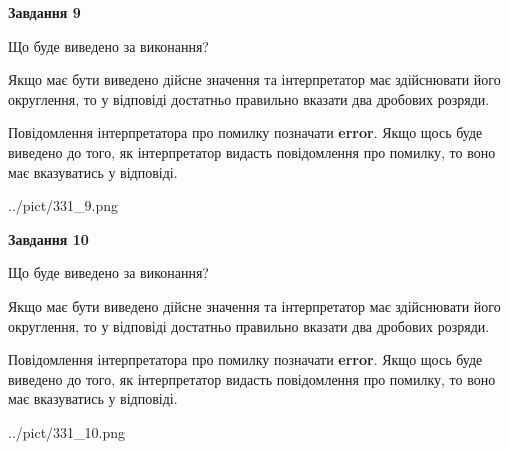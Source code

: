 \documentclass[12pt, ukrainian]{article}
\begin{document}
{\begin {Large}
{\begin {center}\textbf{Завдання 9}\end {center}}\par
Що буде виведено за виконання? \par

Якщо має бути виведено дійсне значення та інтерпретатор має здійснювати його округлення, 
то у відповіді достатньо правильно вказати два дробових розряди.

Повідомлення інтерпретатора про помилку позначати \textbf{error}.
Якщо щось буде виведено до того, як інтерпретатор видасть повідомлення про помилку, 
то воно має вказуватись у відповіді. \par

\begin{center}
	{../pict/331_9.png}
\end{center}
\newpage

{\begin {center}\textbf{Завдання 10}\end {center}}\par
Що буде виведено за виконання? \par

Якщо має бути виведено дійсне значення та інтерпретатор має здійснювати його округлення, 
то у відповіді достатньо правильно вказати два дробових розряди.

Повідомлення інтерпретатора про помилку позначати \textbf{error}.
Якщо щось буде виведено до того, як інтерпретатор видасть повідомлення про помилку, 
то воно має вказуватись у відповіді. \par

\begin{center}
	{../pict/331_10.png}
\end{center}
\newpage

\end {Large}}
\end{document}
